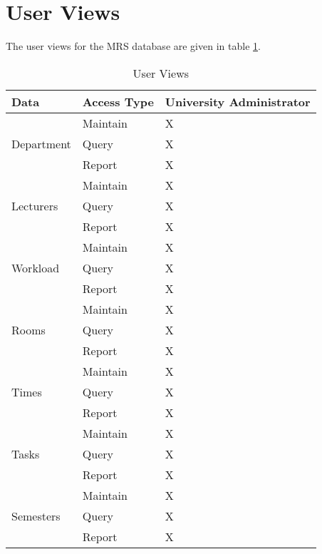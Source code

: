 \clearpage

\section{User Views}
The user views for the MRS database are given in table \ref{tab:userviews}.

\begin{table}[h]
	\centering
	\begin{tabularx}{\textwidth}{XXX}
		Data & Access Type & University Administrator\\
		\toprule
				& Maintain	& X\\
		Department	& Query		& X\\
				& Report	& X\\
		\midrule
				& Maintain	& X\\
		Lecturers	& Query		& X\\
				& Report	& X\\
		\midrule
				& Maintain	& X\\
		Workload	& Query		& X\\
				& Report	& X\\
		\midrule
				& Maintain	& X\\
		Rooms		& Query		& X\\
				& Report	& X\\
		\midrule
				& Maintain	& X\\
		Times		& Query		& X\\
				& Report	& X\\
		\midrule
				& Maintain	& X\\
		Tasks		& Query		& X\\
				& Report	& X\\
		\midrule
				& Maintain	& X\\
		Semesters	& Query		& X\\
				& Report	& X\\
	\end{tabularx}
	\caption{User Views}
	\label{tab:userviews}
\end{table}

